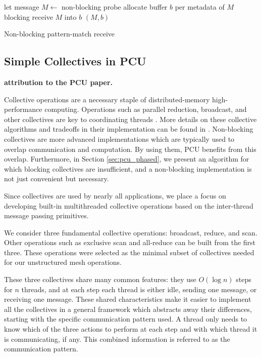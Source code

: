 \begin{algorithm}
\LinesNumbered
{}
let message $M \gets$ non-blocking probe\;
allocate buffer $b$ per metadata of $M$\;
blocking receive $M$ into $b$\;
\Return $(M,b)$\;
\caption{Non-blocking pattern-match receive}
\label{alg:receive}
\end{algorithm}

\subsection{Simple Collectives in PCU}
\label{sec:pcu_coll}

{\bf attribution to the PCU paper.}

Collective operations are a necessary staple of
distributed-memory high-performance computing.
Operations such as parallel reduction, broadcast, and other collectives
are key to coordinating threads \cite{pjevsivac2007performance}.
More details on these collective algorithms and tradeoffs in their
implementation can be found in \cite{thakur2003improving}.
Non-blocking collectives are more advanced implementations which
are typically used to overlap communication and computation.
By using them, PCU benefits from this overlap.
Furthermore, in Section \ref{sec:pcu_phased}, we present an algorithm
for which blocking collectives are insufficient, and a non-blocking
implementation is not just convenient but necessary.

Since collectives are used by nearly all applications,
we place a focus on developing built-in
multithreaded collective operations based on the
inter-thread message passing primitives.

We consider three fundamental collective operations:
broadcast, reduce, and scan.
Other operations such as exclusive scan and all-reduce
can be built from the first three.
These operations were selected as the minimal subset
of collectives needed for our unstructured mesh operations.

These three collectives share many common features:
they use $O(\log n)$ steps for $n$ threads,
and at each step each thread is either idle, sending one
message, or receiving one message.
These shared characteristics make it easier to implement
all the collectives in a general framework which abstracts
away their differences, starting with the specific communication
pattern used.
A thread only needs to know which of the three actions to perform at each
step and with which thread it is communicating, if any.
This combined information is referred to as the communication pattern.

